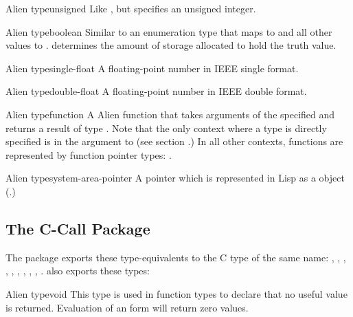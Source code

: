 \begin{deftp}{Alien type}{unsigned}{}
  Like , but specifies an unsigned integer.
\end{deftp}

\begin{deftp}{Alien type}{boolean}{}
  Similar to an enumeration type that maps  to \false{} and
  all other values to \true.   determines the amount of
  storage allocated to hold the truth value.
\end{deftp}

\begin{deftp}{Alien type}{single-float}{}
  A floating-point number in IEEE single format.
\end{deftp}

\begin{deftp}{Alien type}{double-float}{}
  A floating-point number in IEEE double format.
\end{deftp}

\begin{deftp}{Alien type}{function}{ }
  \label{alien-function-types}
  A Alien function that takes arguments of the specified
   and returns a result of type .
  Note that the only context where a  type is directly
  specified is in the argument to  (see section
  .)  In all other contexts, functions are
  represented by function pointer types: .
\end{deftp}

\begin{deftp}{Alien type}{system-area-pointer}{}
  A pointer which is represented in Lisp as a
   object (.)
\end{deftp}


\subsection{The C-Call Package}

The  package exports these type-equivalents to the C type
of the same name: , , , ,
, , ,
, , .   also
exports these types:

\begin{deftp}{Alien type}{void}{}
  This type is used in function types to declare that no useful value
  is returned.  Evaluation of an  form will return
  zero values.
\end{deftp}

